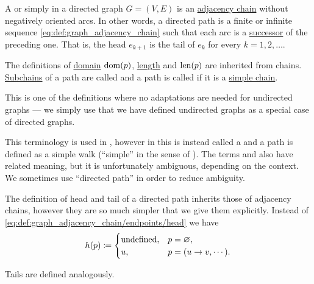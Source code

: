 \begin{definition}\label{def:graph_directed_path}
  A  or simply  in a directed graph \( G = (V, E) \) is an \hyperref[def:graph_adjacency_chain]{adjacency chain} without negatively oriented arcs. In other words, a directed path is a finite or infinite sequence \eqref{eq:def:graph_adjacency_chain} such that each arc is a \hyperref[def:graph/adjacency]{successor} of the preceding one. That is, the head \( e_{k+1} \) is the tail of \( e_k \) for every \( k = 1, 2, \ldots \).

  The definitions of \hyperref[def:graph_adjacency_chain/domain]{domain} \( \operatorname{dom}(p) \), \hyperref[def:graph_adjacency_chain/length]{length} and \( \operatorname{len}(p) \) are inherited from chains. \hyperref[def:graph_adjacency_chain/subchain]{Subchains} of a path are called  and a path is called  if it is a \hyperref[def:graph_adjacency_chain/simple]{simple chain}.

  This is one of the definitions where no adaptations are needed for undirected graphs --- we simply use that we have defined undirected graphs as a special case of directed graphs.

  This terminology is used in , however in \cite[sec. 5.2]{Erickson2019} this is instead called a  and a path is defined as a simple walk (\enquote{simple} in the sense of ). The terms  and  also have related meaning, but it is unfortunately ambiguous, depending on the context. We sometimes use \enquote{directed path} in order to reduce ambiguity.

  \begin{thmenum}
     The definition of head and tail of a directed path inherits those of adjacency chains, however they are so much simpler that we give them explicitly. Instead of \eqref{eq:def:graph_adjacency_chain/endpoints/head} we have
    \begin{equation}\label{eq:def:graph_directed_path/endpoints/head}
      h(p) \coloneqq \begin{cases}
        \T{undefined}, &p = \varnothing, \\
        u,             &p = (u \to v, \cdots).
      \end{cases}
    \end{equation}

    Tails are defined analogously.


\end{thmenum}
\end{definition}
